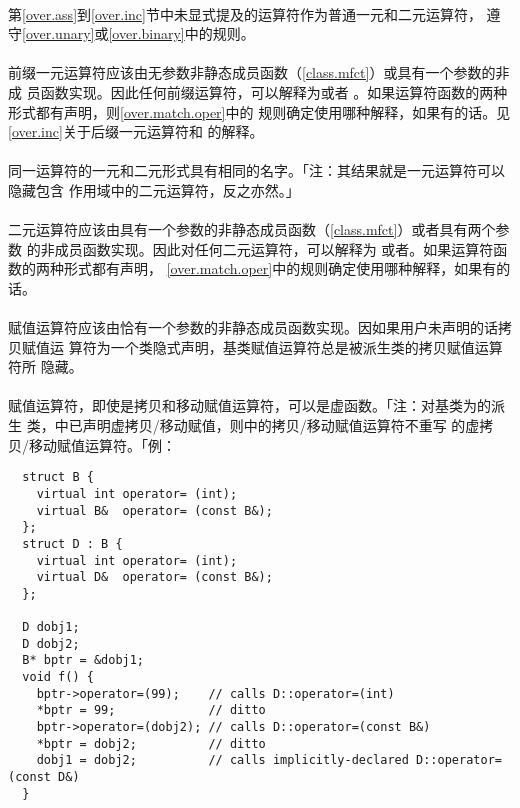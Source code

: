 \paragraph{}
第\ref{over.ass}到\ref{over.inc}节中未显式提及的运算符作为普通一元和二元运算符，
遵守\ref{over.unary}或\ref{over.binary}中的规则。

\paragraph{}
前缀一元运算符应该由无参数非静态成员函数（\ref{class.mfct}）或具有一个参数的非成
员函数实现。因此任何前缀运算符，可以解释为或者
。如果运算符函数的两种形式都有声明，则\ref{over.match.oper}中的
规则确定使用哪种解释，如果有的话。见\ref{over.inc}关于后缀一元运算符\tm{++}和
\tm{--}的解释。

\paragraph{}
同一运算符的一元和二元形式具有相同的名字。「注：其结果就是一元运算符可以隐藏包含
作用域中的二元运算符，反之亦然。」

\paragraph{}
二元运算符应该由具有一个参数的非静态成员函数（\ref{class.mfct}）或者具有两个参数
的非成员函数实现。因此对任何二元运算符，可以解释为
或者。如果运算符函数的两种形式都有声明，
\ref{over.match.oper}中的规则确定使用哪种解释，如果有的话。

\paragraph{}
赋值运算符应该由恰有一个参数的非静态成员函数实现。因如果用户未声明的话拷贝赋值运
算符为一个类隐式声明，基类赋值运算符总是被派生类的拷贝赋值运算符所
隐藏。

\paragraph{}
赋值运算符，即使是拷贝和移动赋值运算符，可以是虚函数。「注：对基类为的派生
类，中已声明虚拷贝/移动赋值，则中的拷贝/移动赋值运算符不重写
的虚拷贝/移动赋值运算符。「例：
\begin{lstlisting}
  struct B {
    virtual int operator= (int);
    virtual B&  operator= (const B&);
  };
  struct D : B {
    virtual int operator= (int);
    virtual D&  operator= (const B&);
  };

  D dobj1;
  D dobj2;
  B* bptr = &dobj1;
  void f() {
    bptr->operator=(99);    // calls D::operator=(int)
    *bptr = 99;             // ditto
    bptr->operator=(dobj2); // calls D::operator=(const B&)
    *bptr = dobj2;          // ditto
    dobj1 = dobj2;          // calls implicitly-declared D::operator=(const D&)
  }
\end{lstlisting}

